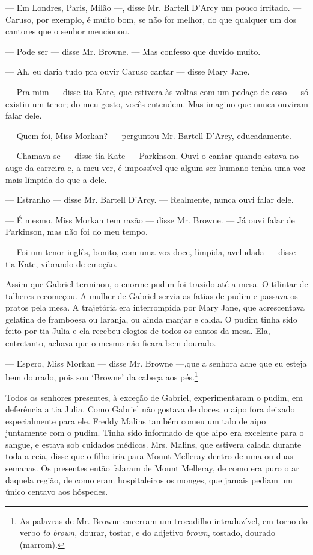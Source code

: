 --- Em Londres, Paris, Milão ---, disse Mr. Bartell D'Arcy um pouco
irritado. --- Caruso, por exemplo, é muito bom, se não for melhor, do
que qualquer um dos cantores que o senhor mencionou.

--- Pode ser --- disse Mr. Browne. --- Mas confesso que duvido muito.

--- Ah, eu daria tudo pra ouvir Caruso cantar --- disse Mary Jane.

--- Pra mim --- disse tia Kate, que estivera às voltas com um pedaço
de osso --- só existiu um tenor; do meu gosto, vocês entendem. Mas
imagino que nunca ouviram falar dele.

--- Quem foi, Miss Morkan? --- perguntou Mr. Bartell D'Arcy,
educadamente.

--- Chamava-se --- disse tia Kate --- Parkinson. Ouvi-o cantar quando
estava no auge da carreira e, a meu ver, é impossível que algum ser
humano tenha uma voz mais límpida do que a dele.

--- Estranho --- disse Mr. Bartell D'Arcy. --- Realmente, nunca ouvi
falar dele.

--- É mesmo, Miss Morkan tem razão --- disse Mr. Browne. --- Já ouvi
falar de Parkinson, mas não foi do meu tempo.

--- Foi um tenor inglês, bonito, com uma voz doce, límpida, aveludada
--- disse tia Kate, vibrando de emoção.

Assim que Gabriel terminou, o enorme pudim foi trazido até a mesa. O
tilintar de talheres recomeçou. A mulher de Gabriel servia as fatias
de pudim e passava os pratos pela mesa. A trajetória era interrompida
por Mary Jane, que acrescentava gelatina de framboesa ou laranja, ou
ainda manjar e calda. O pudim tinha sido feito por tia Julia e ela
recebeu elogios de todos os cantos da mesa. Ela, entretanto, achava
que o mesmo não ficara bem dourado.

--- Espero, Miss Morkan --- disse Mr. Browne ---,que a senhora ache
que eu esteja bem dourado, pois sou `Browne' da cabeça aos
pés.\footnote{ As palavras de Mr. Browne encerram um trocadilho
intraduzível, em torno do verbo \textit{to brown}, dourar, tostar, e do
adjetivo \textit{brown}, tostado, dourado (marrom).}

Todos os senhores presentes, à exceção de Gabriel, experimentaram o
pudim, em deferência a tia Julia. Como Gabriel não gostava de doces, o
aipo fora deixado especialmente para ele. Freddy Malins também comeu
um talo de aipo juntamente com o pudim. Tinha sido informado de que
aipo era excelente para o sangue, e estava sob cuidados médicos. Mrs.
Malins, que estivera calada durante toda a ceia, disse que o filho
iria para Mount Melleray dentro de uma ou duas semanas. Os presentes
então falaram de Mount Melleray, de como era puro o ar daquela região,
de como eram hospitaleiros os monges, que jamais pediam um único
centavo aos hóspedes.

